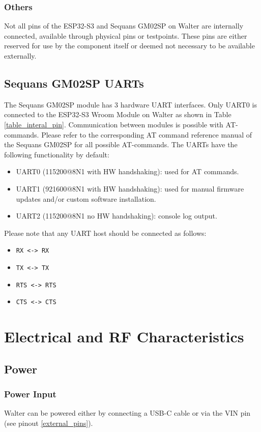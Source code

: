 \documentclass[11pt]{article}
\begin{document}
\subsubsection{Others}
Not all pins of the ESP32-S3 and Sequans GM02SP on Walter are internally connected, available through physical pins or testpoints. These pins are either reserved for use by the component itself or deemed not necessary to be available externally.

\subsection{Sequans GM02SP UARTs} \label{lte_uart}
The Sequans GM02SP module has 3 hardware UART interfaces. Only UART0 is connected to the ESP32-S3 Wroom Module on Walter as shown in Table \ref{table_interal_pin}. Communication between modules is possible with AT-commands. Please refer to the corresponding AT command reference manual of the Sequans GM02SP for all possible AT-commands. The UARTs have the following functionality by default:
\begin{itemize}
	\item UART0 (115200@8N1 with HW handshaking): used for AT commands.
	\item UART1 (921600@8N1 with HW handshaking): used for manual firmware updates and/or custom software installation.
	\item UART2 (115200@8N1 no HW handshaking): console log output.
\end{itemize}

Please note that any UART host should be connected as follows:
\begin{itemize}
	\item \verb+RX <-> RX+
	\item \verb+TX <-> TX+
	\item \verb+RTS <-> RTS+
	\item \verb+CTS <-> CTS+
\end{itemize}
\section{Electrical and RF Characteristics} \label{power_rf_characteristics}
\subsection{Power} \label{power}
\subsubsection{Power Input}
Walter can be powered either by connecting a USB-C cable or via the VIN pin (see pinout \ref{external_pins}).\\
\end{document}
